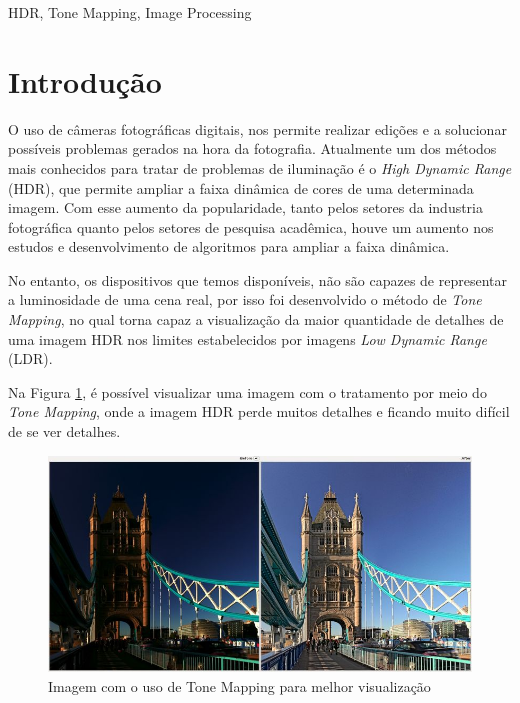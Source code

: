 \documentclass[conference]{IEEEtran}
\begin{document}
\begin{IEEEkeywords}
HDR, Tone Mapping, Image Processing
\end{IEEEkeywords}

\section{Introdução}

O uso de câmeras fotográficas digitais, nos permite realizar edições e a solucionar possíveis problemas gerados na hora da fotografia. Atualmente um dos métodos mais conhecidos para tratar de problemas de iluminação é o \textit{High Dynamic Range} (HDR), que permite ampliar a faixa dinâmica de cores de uma determinada imagem. Com esse aumento da popularidade, tanto pelos setores da industria fotográfica quanto pelos setores de pesquisa acadêmica, houve um aumento nos estudos e desenvolvimento de algoritmos para ampliar a faixa dinâmica.

No entanto, os dispositivos que temos disponíveis, não são capazes de representar a luminosidade de uma cena real, por isso foi desenvolvido o método de \textit{Tone Mapping}, no qual torna capaz a visualização da maior quantidade de detalhes de uma imagem HDR nos limites estabelecidos por imagens \textit{Low Dynamic Range} (LDR). \cite{ICIAS}

Na Figura \ref{TM}, é possível visualizar uma imagem com o tratamento por meio do \textit{Tone Mapping}, onde a imagem HDR perde muitos detalhes e ficando muito difícil de se ver detalhes.

\begin{figure}[!htpb]
    \centering
    \includegraphics[scale=.20]{Imagens/hdrldr.jpg}
    \caption{Imagem com o uso de Tone Mapping para melhor visualização \cite{RawPedia}}
    \label{TM}
\end{figure}
\end{document}
